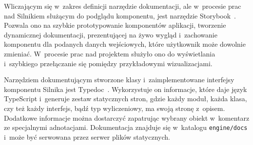 Wliczającym się w~zakres definicji narzędzie dokumentacji, ale w~procesie prac nad Silnikiem służącym do podglądu komponentu, jest narzędzie Storybook~\cite{Storybook}. Pozwala ono na szybkie prototypowanie komponentów aplikacji, tworzenie dynamicznej dokumentacji, prezentującej na żywo wygląd i~zachowanie komponentu dla podanych danych wejściowych, które użytkownik może dowolnie zmieniać. W~procesie prac nad projektem służyło ono do wyświetlania i~szybkiego przełączanie się pomiędzy przykładowymi wizualizacjami.

Narzędziem dokumentującym stworzone klasy i~zaimplementowane interfejsy komponentu Silnika jest Typedoc~\cite{Typedoc}. Wykorzystuje on informacje, które daje język TypeScript i~generuje zestaw statycznych stron, gdzie każdy moduł, każda klasa, czy też każdy interfejs, bądź typ wyliczeniowy, ma swoją stronę z~opisem. Dodatkowe informacje można dostarczyć zapatrując wybrany obiekt w~komentarz ze specjalnymi adnotacjami. Dokumentacja znajduje się w~katalogu \texttt{engine/docs} i~może być serwowana przez serwer plików statycznych.
